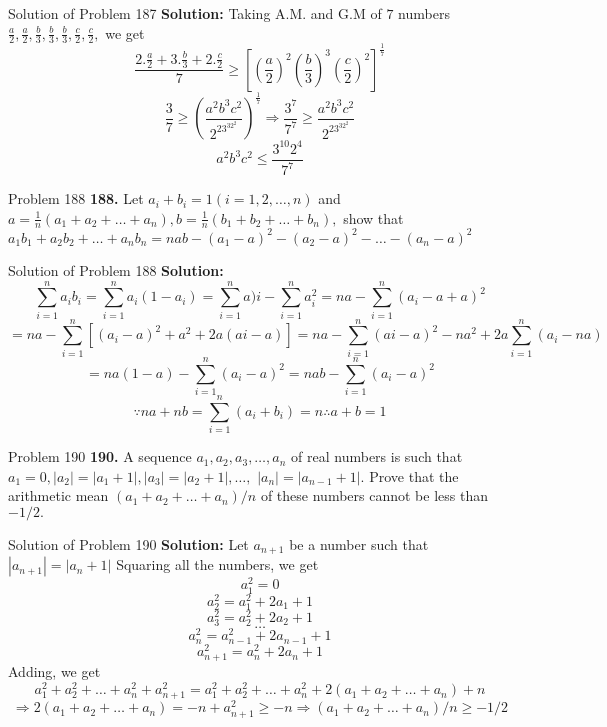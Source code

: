 \documentclass[aspectratio=1610,8pt]{beamer}
\begin{document}
\begin{frame}{Solution of Problem 187}
  \textbf{Solution:} Taking A.M. and G.M of $7$ numbers $\frac{a}{2}, \frac{a}{2}, \frac{b}{3}, \frac{b}{3}, \frac{b}{3},
  \frac{c}{2}, \frac{c}{2},$ we get
  $$\frac{2.\frac{a}{2} + 3.\frac{b}{3} + 2.\frac{c}{2}}{7}\geq
  \left[\left(\frac{a}{2}\right)^2\left(\frac{b}{3}\right)^3\left(\frac{c}{2}\right)^2\right]^{\frac{1}{7}}$$
  $$\frac{3}{7}\geq \left(\frac{a^2b^3c^2}{2^23^32^2}\right)^{\frac{1}{7}}\Rightarrow \frac{3^7}{7^7}\geq
  \frac{a^2b^3c^2}{2^23^32^2}$$
  $$a^2b^3c^2 \leq \frac{3^{10}2^4}{7^7}$$
\end{frame}
\begin{frame}{Problem 188}
  \textbf{188.} Let $a_i + b_i = 1(i = 1, 2, \ldots, n)$ and $a = \frac{1}{n}(a_1 + a_2 + \ldots + a_n), b=\frac{1}{n}(b_1 + b_2 +
  \ldots + b_n),$ show that $a_1b_1 + a_2b_2 + \ldots + a_nb_n = nab - (a_1 - a)^2 - (a_2 - a)^2 - \ldots - (a_n - a)^2$
\end{frame}
\begin{frame}{Solution of Problem 188}
  \textbf{Solution:} $$\sum_{i=1}^na_ib_i = \sum_{i=1}^na_i(1 - a_i) = \sum_{i=1}^na)i - \sum_{i=1}^na_i^2 = na - \sum_{i=1}^n(a_i
  - a + a)^2$$
  $$= na - \sum_{i=1}^n[(a_i - a)^2 + a^2 + 2a(ai - a)] = na - \sum_{i=1}^n(ai - a)^2 - na^2 + 2a\sum_{i=1}^n(a_i - na)$$
  $$= na(1 - a) - \sum_{i=1}^n(a_i - a)^2 = nab - \sum_{i=1}^n(a_i - a)^2$$
  $$\because na + nb = \sum_{i=1}^n(a_i + b_i) = n \therefore a+ b = 1$$
\end{frame}
\begin{frame}{Problem 190}
  \textbf{190.} A sequence $a_1, a_2, a_3, \ldots, a_n$ of real numbers is such that $a_1=0, |a_2| = |a_1 + 1|, |a_3| = |a_2 + 1|,
  \ldots,$ $|a_n| = |a_{n - 1} + 1|.$ Prove that the arithmetic mean $(a_1 + a_2 + \ldots + a_n)/n$ of these numbers cannot be less
  than $-1/2.$
\end{frame}
\begin{frame}{Solution of Problem 190}
  \textbf{Solution:} Let $a_{n+1}$ be a number such that $|a_{n+1}| = |a_n + 1|$
  \linebreak\linebreak
  Squaring all the numbers, we get
  \linebreak\linebreak
  $$a_1^2 = 0$$
  $$a_2^2 = a_1^2 + 2a_1 + 1$$
  $$a_3^2 = a_2^2 + 2a_2 + 1$$
  $$\ldots$$
  $$a_n^2 = a_{n-1}^2 + 2a_{n-1} + 1$$
  $$a_{n+1}^2 = a_n^2 + 2a_n + 1$$
  Adding, we get
  $$a_1^2 + a_2^2 + \ldots + a_n^2 + a_{n+1}^2 = a_1^2 + a_2^2 + \ldots + a_n^2 + 2(a_1 + a_2 + \ldots + a_n) + n$$
  $$\Rightarrow 2(a_1 + a_2 + \ldots + a_n) = -n + a_{n+1}^2 \geq -n \Rightarrow (a_1 + a_2 + \ldots + a_n)/n\geq -1/2$$
\end{frame}
\end{document}
